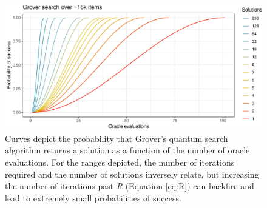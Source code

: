 \documentclass[12pt]{article} %
\begin{document}
\begin{figure}[!t]
	\centering
	\includegraphics[width=0.8\linewidth]{groverCurves.pdf}
	\caption{Curves depict the probability that Grover's quantum search algorithm returns a solution as a function of the number of oracle evaluations. For the ranges depicted, the number of iterations required and the number of solutions inversely relate, but increasing the number of iterations past \emph{R} (Equation \ref{eq:R}) can backfire and lead to extremely small probabilities of success.  }\label{fig:grov}
\end{figure}
\end{document}
